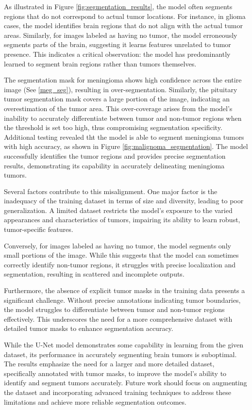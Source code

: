 As illustrated in Figure \ref{fig:segmentation_results}, the model often segments regions that do not correspond to actual tumor locations. For instance, in glioma cases, the model identifies brain regions that do not align with the actual tumor areas. Similarly, for images labeled as having no tumor, the model erroneously segments parts of the brain, suggesting it learns features unrelated to tumor presence. This indicates a critical observation: the model has predominantly learned to segment brain regions rather than tumors themselves.

The segmentation mask for meningioma shows high confidence across the entire image (See \ref{meg_seg}), resulting in over-segmentation. Similarly, the pituitary tumor segmentation mask covers a large portion of the image, indicating an overestimation of the tumor area. This over-coverage arises from the model's inability to accurately differentiate between tumor and non-tumor regions when the threshold is set too high, thus compromising segmentation specificity. Additional testing revealed tht the model is able to segment meningioma tumors with high accuracy, as shown in Figure \ref{fig:malignoma_segmentation}. The model successfully identifies the tumor regions and provides precise segmentation results, demonstrating its capability in accurately delineating meningioma tumors.

Several factors contribute to this misalignment. One major factor is the inadequacy of the training dataset in terms of size and diversity, leading to poor generalization. A limited dataset restricts the model's exposure to the varied appearances and characteristics of tumors, impairing its ability to learn robust, tumor-specific features. 

Conversely, for images labeled as having no tumor, the model segments only small portions of the image. While this suggests that the model can sometimes correctly identify non-tumor regions, it struggles with precise localization and segmentation, resulting in scattered and incomplete outputs.

Furthermore, the absence of explicit tumor masks in the training data presents a significant challenge. Without precise annotations indicating tumor boundaries, the model struggles to differentiate between tumor and non-tumor regions effectively. This underscores the need for a more comprehensive dataset with detailed tumor masks to enhance segmentation accuracy.

While the U-Net model demonstrates some capability in learning from the given dataset, its performance in accurately segmenting brain tumors is suboptimal. The results emphasize the need for a larger and more detailed dataset, specifically annotated with tumor masks, to improve the model's ability to identify and segment tumors accurately. Future work should focus on augmenting the dataset and incorporating advanced training techniques to address these limitations and achieve more reliable segmentation outcomes.


